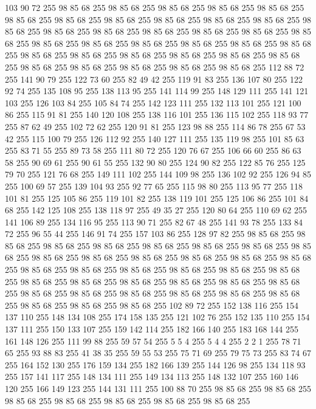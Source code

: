 103 90 72 255 98 85 68 255 98 85 68 255 98 85 68 255 98 85 68 255 98 85 68 255 98 85 68 255 98 85 68 255 98 85 68 255 98 85 68 255 98 85 68 255 98 85 68 255 98 85 68 255 98 85 68 255 98 85 68 255 98 85 68 255 98 85 68 255 98 85 68 255 98 85 68 255 98 85 68 255 98 85 68 255 98 85 68 255 98 85 68 255 98 85 68 255 98 85 68 255 98 85 68 255 98 85 68 255 98 85 68 255 98 85 68 255 98 85 68 255 98 85 68 255 98 85 68 255 98 85 68 255 98 85 68 255 98 85 68 255 98 85 68 255 112 88 72 255 141 90 79 255 122 73 60 255 82 49 42 255 119 91 83 255 136 107 80 255 122 92 74 255 135 108 95 255 138 113 95 255 141 114 99 255 148 129 111 255 141 121 103 255 126 103 84 255 105 84 74 255 142 123 111 255 132 113 101 255 121 100 86 255 115 91 81 255 140 120 108 255 138 116 101 255 136 115 102 255 118 93 77 255 87 62 49 255 102 72 62 255 120 91 81 255 123 98 88 255 114 86 78 255 67 53 42 255
115 100 79 255 126 112 92 255 140 127 111 255 135 119 98 255 101 85 63 255 83 71 55 255 89 73 58 255 111 80 72 255 120 76 67 255 106 66 60 255 86 63 58 255 90 69 61 255 90 61 55 255 132 90 80 255 124 90 82 255 122 85 76 255 125 79 70 255 121 76 68 255 149 111 102 255 144 109 98 255 136 102 92 255 126 94 85 255 100 69 57 255 139 104 93 255 92 77 65 255 115 98 80 255 113 95 77 255 118 101 81 255 125 105 86 255 119 101 82 255 138 119 101 255 125 106 86 255 101 84 68 255 142 125 108 255 138 118 97 255 49 35 27 255 120 80 64 255 110 69 62 255 141 106 89 255 134 116 95 255 113 90 71 255 82 67 48 255 141 93 78 255 133 84 72 255 96 55 44 255 146 91 74 255 157 103 86 255 128 97 82 255 98 85 68 255 98 85 68 255 98 85 68 255 98 85 68 255 98 85 68 255 98 85 68 255 98 85 68 255 98 85 68 255 98 85 68 255 98 85 68 255 98 85 68 255 98 85 68 255 98 85 68 255 98 85 68 255 98 85 68 255 98 85 68 255
98 85 68 255 98 85 68 255 98 85 68 255 98 85 68 255 98 85 68 255 98 85 68 255 98 85 68 255 98 85 68 255 98 85 68 255 98 85 68 255 98 85 68 255 98 85 68 255 98 85 68 255 98 85 68 255 98 85 68 255 98 85 68 255 98 85 68 255 98 85 68 255 98 85 68 255 102 89 72 255 152 138 116 255 154 137 110 255 148 134 108 255 174 158 135 255 121 102 76 255 152 135 110 255 154 137 111 255 150 133 107 255 159 142 114 255 182 166 140 255 183 168 144 255 161 148 126 255 111 99 88 255 59 57 54 255 5 5 4 255 5 4 4 255 2 2 1 255 78 71 65 255 93 88 83 255 41 38 35 255 59 55 53 255 75 71 69 255 79 75 73 255 83 74 67 255 164 152 130 255 176 159 134 255 182 166 139 255 144 126 98 255 134 118 93 255 157 141 117 255 148 134 111 255 149 134 113 255 148 132 107 255 160 146 120 255 166 149 123 255 144 131 111 255 100 88 70 255 98 85 68 255 98 85 68 255 98 85 68 255 98 85 68 255 98 85 68 255 98 85 68 255 98 85 68 255
